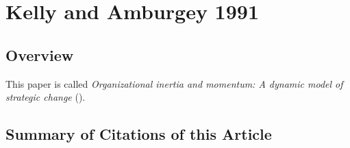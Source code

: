 \section{Kelly and Amburgey 1991}

\subsection{Overview}

This paper is called {\it Organizational inertia and momentum: A dynamic model of strategic change} (\cite{kelly1991organizational}).\\

\subsection{Summary of Citations of this Article}

